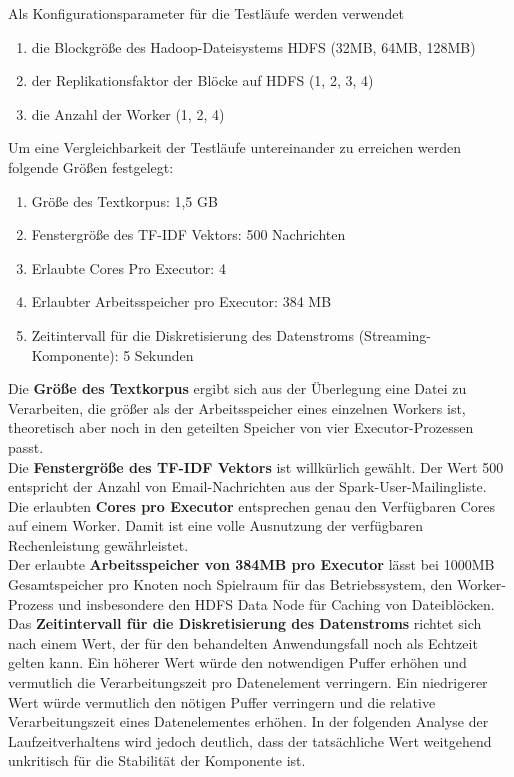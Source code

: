 Als Konfigurationsparameter für die Testläufe werden verwendet
\begin{enumerate}
	\item die Blockgröße des Hadoop-Dateisystems HDFS (32MB, 64MB, 128MB)
	\item der Replikationsfaktor der Blöcke auf HDFS (1, 2, 3, 4)
	\item die Anzahl der Worker (1, 2, 4)
\end{enumerate}

Um eine Vergleichbarkeit der Testläufe untereinander zu erreichen werden folgende Größen festgelegt:
\begin{enumerate}
	\item Größe des Textkorpus: 1,5 GB
	\item Fenstergröße des TF-IDF Vektors: 500 Nachrichten
	\item Erlaubte Cores Pro Executor: 4
	\item Erlaubter Arbeitsspeicher pro Executor: 384 MB
	\item Zeitintervall für die Diskretisierung des Datenstroms (Streaming-Komponente): 5 Sekunden
\end{enumerate}

Die \textbf{Größe des Textkorpus} ergibt sich aus der Überlegung eine Datei zu Verarbeiten, die größer als der Arbeitsspeicher eines einzelnen Workers ist, theoretisch aber noch in den geteilten Speicher von vier Executor-Prozessen passt.\\

Die \textbf{Fenstergröße des TF-IDF Vektors} ist willkürlich gewählt. Der Wert 500 entspricht der Anzahl von Email-Nachrichten aus der Spark-User-Mailingliste.\\

Die erlaubten \textbf{Cores pro Executor} entsprechen genau den Verfügbaren Cores auf einem Worker. Damit ist eine volle Ausnutzung der verfügbaren Rechenleistung gewährleistet.\\

Der erlaubte \textbf{Arbeitsspeicher von 384MB pro Executor} lässt bei 1000MB Gesamtspeicher pro Knoten noch Spielraum für das Betriebssystem, den Worker-Prozess und insbesondere den HDFS Data Node für Caching von Dateiblöcken.\\

Das \textbf{Zeitintervall für die Diskretisierung des Datenstroms} richtet sich nach einem Wert, der für den behandelten Anwendungsfall noch als Echtzeit gelten kann.
Ein höherer Wert würde den notwendigen Puffer erhöhen und vermutlich die Verarbeitungszeit pro Datenelement verringern. Ein niedrigerer Wert würde vermutlich den nötigen Puffer verringern und die relative Verarbeitungszeit eines Datenelementes erhöhen. In der folgenden Analyse der Laufzeitverhaltens wird jedoch deutlich, dass der tatsächliche Wert weitgehend unkritisch für die Stabilität der Komponente ist.\\

